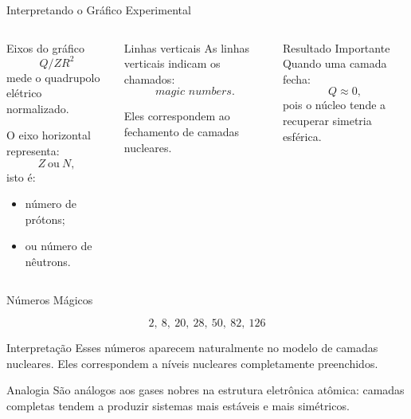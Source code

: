 \documentclass[aspectratio=169]{beamer}
\begin{document}
\begin{frame}{Interpretando o Gráfico Experimental}

\small

\begin{columns}[T]


\begin{mybox}{Eixos do gráfico}
\[
Q/ZR^2
\]
mede o quadrupolo elétrico normalizado.

\vspace{0.2cm}

O eixo horizontal representa:
\[
Z \ \text{ou}\ N,
\]
isto é:

\begin{itemize}
\item número de prótons;
\item ou número de nêutrons.
\end{itemize}
\end{mybox}


\begin{alertblock}{Linhas verticais}
As linhas verticais indicam
os chamados:
\[
\textit{magic numbers}.
\]

Eles correspondem ao fechamento de camadas nucleares.
\end{alertblock}
\begin{mybox}{Resultado Importante}
Quando uma camada fecha:
\[
Q\approx0,
\]
pois o núcleo tende a recuperar simetria esférica.
\end{mybox}
\end{columns}





\end{frame}

\begin{frame}{Números Mágicos}

\begin{center}

\Large
\[
2,\ 8,\ 20,\ 28,\ 50,\ 82,\ 126
\]

\end{center}

\vspace{0.4cm}

\begin{mybox}{Interpretação}
Esses números aparecem naturalmente no modelo de camadas nucleares.
Eles correspondem a níveis nucleares completamente preenchidos.
\end{mybox}

\vspace{0.3cm}

\begin{alertblock}{Analogia}
São análogos aos gases nobres na estrutura eletrônica atômica:
camadas completas tendem a produzir sistemas mais estáveis e mais simétricos.
\end{alertblock}

\end{frame}
\end{document}
